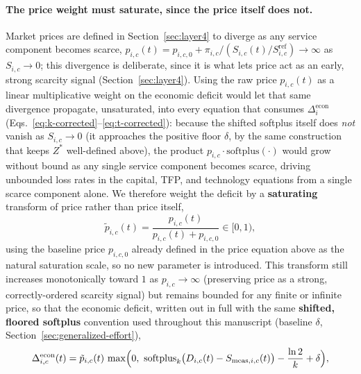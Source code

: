 \documentclass[twocolumn,10pt]{article}
\begin{document}
\paragraph{The price weight must saturate, since the price itself does not.} Market prices are defined in Section~\ref{sec:layer4} to diverge as any service component becomes scarce, $p_{i,c}(t)=p_{i,c,0}+\pi_{i,c}/(S_{i,c}(t)/S_{i,c}^{\text{ref}})\to\infty$ as $S_{i,c}\to0$; this divergence is deliberate, since it is what lets price act as an early, strong scarcity signal (Section~\ref{sec:layer4}). Using the raw price $p_{i,c}(t)$ as a linear multiplicative weight on the economic deficit would let that same divergence propagate, unsaturated, into every equation that consumes $\Delta_i^{\text{econ}}$ (Eqs.~\eqref{eq:k-corrected}--\eqref{eq:t-corrected}): because the shifted softplus itself does \emph{not} vanish as $S_{i,c}\to0$ (it approaches the positive floor $\delta$, by the same construction that keeps $Z^*$ well-defined above), the product $p_{i,c}\cdot\text{softplus}(\cdot)$ would grow without bound as any single service component becomes scarce, driving unbounded loss rates in the capital, TFP, and technology equations from a single scarce component alone. We therefore weight the deficit by a \textbf{saturating} transform of price rather than price itself,
\[
\tilde p_{i,c}(t) = \frac{p_{i,c}(t)}{p_{i,c}(t) + p_{i,c,0}} \in [0,1),
\]
using the baseline price $p_{i,c,0}$ already defined in the price equation above as the natural saturation scale, so no new parameter is introduced. This transform still increases monotonically toward $1$ as $p_{i,c}\to\infty$ (preserving price as a strong, correctly-ordered scarcity signal) but remains bounded for any finite or infinite price, so that the economic deficit, written out in full with the same \textbf{shifted, floored softplus} convention used throughout this manuscript (baseline $\delta$, Section~\ref{sec:generalized-effort}),
\[
\Delta_{i,c}^{\text{econ}}(t) = \tilde p_{i,c}(t)\,\max\Bigl(0,\ \text{softplus}_k\bigl(D_{i,c}(t) - S_{\text{meas},i,c}(t)\bigr) - \frac{\ln 2}{k} + \delta\Bigr),
\]
\end{document}
